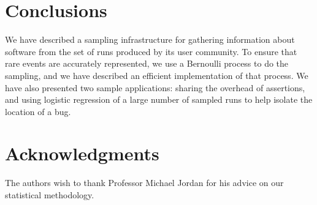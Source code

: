 \section{Conclusions}
\label{sec:conclusions}

We have described a sampling infrastructure for gathering information about
software from the set of runs produced by its user community.  To ensure
that rare events are accurately represented, we use a Bernoulli process to do the sampling,
and we have described an efficient implementation of that process.
We have also presented two sample applications: sharing the overhead of assertions, and 
using logistic regression of a large number of sampled runs to help isolate
the location of a bug.

\section{Acknowledgments}

The authors wish to thank Professor Michael Jordan for his advice on
our statistical methodology.
